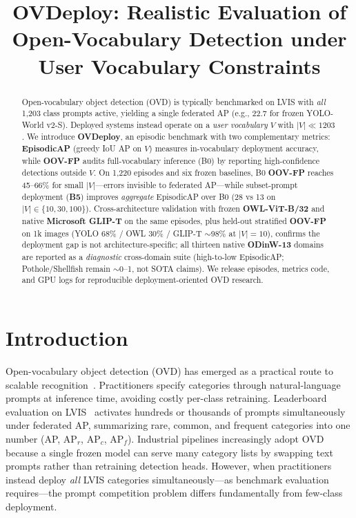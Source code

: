 \documentclass[10pt,twocolumn,letterpaper]{article}
\title{OVDeploy: Realistic Evaluation of Open-Vocabulary Detection under User Vocabulary Constraints}
\begin{document}
\maketitle

\begin{abstract}
Open-vocabulary object detection (OVD) is typically benchmarked on LVIS with \emph{all} 1,203 class prompts active, yielding a single federated AP (e.g., 22.7 for frozen YOLO-World v2-S).
Deployed systems instead operate on a \emph{user vocabulary} $V$ with $|V| \ll 1203$.
We introduce \textbf{OVDeploy}, an episodic benchmark with two complementary metrics: \textbf{EpisodicAP} (greedy IoU AP on $V$) measures in-vocabulary deployment accuracy, while \textbf{OOV-FP} audits full-vocabulary inference (B0) by reporting high-confidence detections outside $V$.
On 1,220 episodes and six frozen baselines, B0 \textbf{OOV-FP} reaches 45--66\% for small $|V|$---errors invisible to federated AP---while subset-prompt deployment (\textbf{B5}) improves \emph{aggregate} EpisodicAP over B0 (28 vs 13 on $|V|{\in}\{10,30,100\}$).
Cross-architecture validation with frozen \textbf{OWL-ViT-B/32} and native \textbf{Microsoft GLIP-T} on the same episodes, plus held-out stratified \textbf{OOV-FP} on 1k images (YOLO 68\% / OWL 30\% / GLIP-T $\sim$98\% at $|V|{=}10$), confirms the deployment gap is not architecture-specific; all thirteen native \textbf{ODinW-13} domains are reported as a \emph{diagnostic} cross-domain suite (high-to-low EpisodicAP; Pothole/Shellfish remain $\sim$0--1, not SOTA claims).
We release episodes, metrics code, and GPU logs for reproducible deployment-oriented OVD research.
\end{abstract}

\section{Introduction}
\label{sec:intro}

Open-vocabulary object detection (OVD) has emerged as a practical route to scalable recognition~\cite{li2022glip,cheng2024yoloworld,radford2021clip}.
Practitioners specify categories through natural-language prompts at inference time, avoiding costly per-class retraining.
Leaderboard evaluation on LVIS~\cite{gupta2019lvis} activates hundreds or thousands of prompts simultaneously under federated AP, summarizing rare, common, and frequent categories into one number (AP, AP$_r$, AP$_c$, AP$_f$).
Industrial pipelines increasingly adopt OVD because a single frozen model can serve many category lists by swapping text prompts rather than retraining detection heads.
However, when practitioners instead deploy \emph{all} LVIS categories simultaneously---as benchmark evaluation requires---the prompt competition problem differs fundamentally from few-class deployment.
\end{document}
